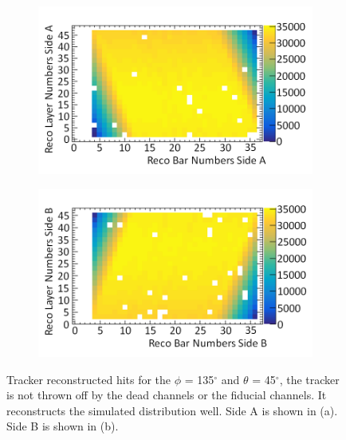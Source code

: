 \begin{figure}[!h]
\centering
\begin{subfigure}{.5\textwidth}
  \centering
  \includegraphics[width=\linewidth]{Chapter6/Figs/Raster/trackedAWithDeadMedText.png}
  \captionsetup{width=.9\linewidth}
  \caption{}
  \label{subFig:trackedAWithDead}
\end{subfigure}%
\begin{subfigure}{.5\textwidth}
  \centering
\includegraphics[width=\linewidth]{Chapter6/Figs/Raster/trackedBWithDeadMedText.png}
  \captionsetup{width=.9\linewidth}
  \caption{}
  \label{subFig:trackedBWithDead}
\end{subfigure}
\caption{Tracker reconstructed hits for the $\phi$ = 135$^\circ$ and $\theta$ = 45$^\circ$, the tracker is not thrown off by the dead channels or the fiducial channels. It reconstructs the simulated distribution well. Side A is shown in (a). Side B is shown in (b).}
\label{fig:trackedABWithDead}
\end{figure}


